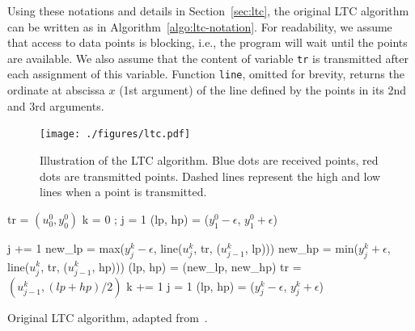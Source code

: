 Using these notations and details in Section~\ref{sec:ltc}, the original LTC
algorithm can be written as in Algorithm~\ref{algo:ltc-notation}. For
readability, we assume that access to data points is blocking, i.e., the program
will wait until the points are available. We also assume that the content of
variable \texttt{tr} is transmitted after each assignment of this variable.
Function \texttt{line}, omitted for brevity, returns the ordinate at abscissa
$x$ (1st argument) of the line defined by the points in its 2nd and 3rd
arguments.

\begin{figure}[H]
\centering
\texttt{[image: ./figures/ltc.pdf]}
\caption{Illustration of the LTC algorithm. Blue 
dots are received points, red dots are transmitted points. Dashed lines 
represent the high and low lines when a point is 
transmitted.\vspace*{-0.3cm}}
\label{fig:ltc-notation}
\end{figure}

\begin{algorithm}
\begin{algorithmic}[1]
\Input
\EndInput
\Output
\EndOutput
\State tr = $(u^0_0, y^0_0)$ 
\State k = 0 ; j = 1
\State (lp, hp) = ($y^0_1 - \epsilon$, $y^0_1 + \epsilon$) 

 
    \State j += 1
    \State new\_lp = max($y^k_j-\epsilon$, line($u^k_j$, tr, ($u^k_{j-1}$, lp)))
    \State new\_hp = min($y^k_j+\epsilon$, line($u^k_j$, tr, ($u^k_{j-1}$, hp)))
     
        \State (lp, hp) = (new\_lp, new\_hp)
    \Else
        \State tr = $(u^k_{j-1}, (lp+hp)/2)$
        \State k += 1
        \State j = 1
        \State (lp, hp) = ($y^k_j-\epsilon$, $y^k_j+\epsilon$)
    \EndIf
\EndWhile
\end{algorithmic}
\caption{Original LTC algorithm, adapted from~\cite{schoellhammer2004lightweight}.}
\label{algo:ltc-notation}
\end{algorithm}


